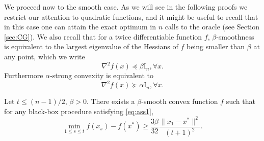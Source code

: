 \documentclass[openany]{now}
\newcommand{\mI}{\mathrm{I}}
\begin{document}
We proceed now to the smooth case. As we will see in the following proofs we restrict our attention to quadratic functions, and it might be useful to recall that in this case one can attain the exact optimum in $n$ calls to the oracle (see Section \ref{sec:CG}). We also recall that for a twice differentiable function $f$, $\beta$-smoothness is equivalent to the largest eigenvalue of the Hessians of $f$ being smaller than $\beta$ at any point, which we write
$$\nabla^2 f(x) \preceq \beta \mI_n , \forall x .$$
Furthermore $\alpha$-strong convexity is equivalent to 
$$\nabla^2 f(x) \succeq \alpha \mI_n , \forall x .$$


\begin{theorem} \label{th:lb2}
Let $t \leq (n-1)/2$, $\beta >0$. There exists a $\beta$-smooth convex function $f$ such that for any black-box procedure satisfying \eqref{eq:ass1},
$$\min_{1 \leq s \leq t} f(x_s) - f(x^*) \geq  \frac{3 \beta}{32} \frac{\|x_1 - x^*\|^2}{(t+1)^2} .$$
\end{theorem}
\end{document}
